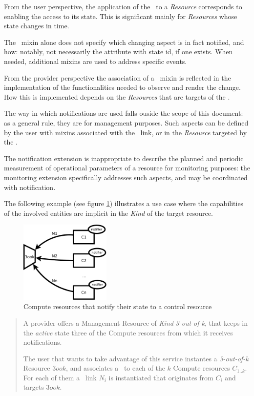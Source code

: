 \documentclass[10pt,a4paper]{article}
\begin{document}
From the user perspective, the application of the \smx\ to a {\em Resource} corresponds to enabling the access to its state. This is significant mainly for {\em Resources} whose state changes in time.

The \smx\ mixin alone does not specify which changing aspect is in fact notified, and how: notably, not necessarily the attribute with {\sc state} id, if one exists. When needed, additional mixins are used to address specific events.

From the provider perspective the association of a \smx\ mixin is reflected in the implementation of the functionalities needed to observe and render the change. How this is implemented depends on the {\em Resources} that are targets of the \ntfl.

The way in which notifications are used falls ouside the scope of this document: as a general rule, they are for management purposes. Such aspects can be defined by the user with mixins associated with the \ntfl\ link, or in the {\em Resource} targeted by the \ntfl.

The notification extension is inappropriate to describe the planned and periodic measurement of operational parameters of a resource for monitoring purposes: the monitoring extension \cite{occi:monitoring} specifically addresses such aspects, and may be coordinated with notification.

The following example (see figure \ref{fig:example}) illustrates a use case where the capabilities of the involved entities are implicit in the {\em Kind} of the target resource.

\begin{figure}
\centering
\includegraphics[width=0.4\textwidth]{figs/notificationExample.pdf}
\caption{Compute resources that notify their state to a control resource \label{fig:example}}
\end{figure}

\begin{quote}
A provider offers a Management Resource of {\em Kind} {\em 3-out-of-k}, that keeps in the {\em active} state three of the Compute resources from which it receives notifications.

The user that wants to take advantage of this service instantes a {\em 3-out-of-k} Resource $3ook$, and associates a \smx\ to each of the $k$ Compute resources $C_{1..k}$. For each of them a \ntfl\ link $N_i$ is instantiated that originates from $C_i$ and targets $3ook$.
\end{quote}
\end{document}
